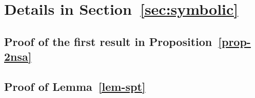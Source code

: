 \section{Details in Section~\ref{sec:symbolic}}\label{app-sym}

\subsection{Proof of the first result in Proposition~\ref{prop-2nsa}}

\subsection{Proof of Lemma~\ref{lem-spt}}
